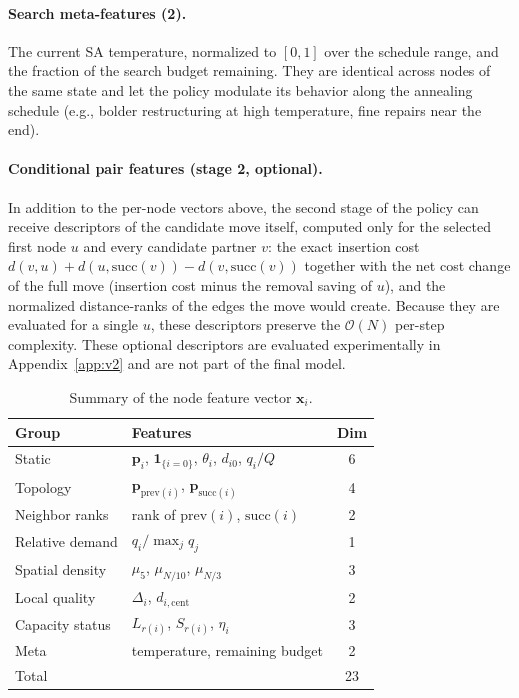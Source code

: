 \documentclass[letterpaper]{article} %
\begin{document}
\paragraph{Search meta-features (2).}
The current SA temperature, normalized to $[0,1]$ over the schedule range, and the fraction of the search budget remaining. They are identical across nodes of the same state and let the policy modulate its behavior along the annealing schedule (e.g., bolder restructuring at high temperature, fine repairs near the end).

\paragraph{Conditional pair features (stage 2, optional).}
In addition to the per-node vectors above, the second stage of the policy can receive descriptors of the candidate move itself, computed only for the selected first node $u$ and every candidate partner $v$: the exact insertion cost $d(v, u) + d(u, \mathrm{succ}(v)) - d(v, \mathrm{succ}(v))$ together with the net cost change of the full move (insertion cost minus the removal saving of $u$), and the normalized distance-ranks of the edges the move would create. Because they are evaluated for a single $u$, these descriptors preserve the $\mathcal{O}(N)$ per-step complexity. These optional descriptors are evaluated experimentally in Appendix~\ref{app:v2} and are not part of the final model.


\begin{table}[t]
\centering
\small
\begin{tabular}{l l c}
\toprule
\textbf{Group} & \textbf{Features} & \textbf{Dim} \\
\midrule
Static & $\mathbf{p}_i$, $\mathbf{1}_{\{i=0\}}$, $\theta_i$, $d_{i0}$, $q_i/Q$ & 6 \\
Topology & $\mathbf{p}_{\mathrm{prev}(i)}$, $\mathbf{p}_{\mathrm{succ}(i)}$ & 4 \\
Neighbor ranks & rank of $\mathrm{prev}(i)$, $\mathrm{succ}(i)$ & 2 \\
Relative demand & $q_i / \max_j q_j$ & 1 \\
Spatial density & $\mu_5$, $\mu_{N/10}$, $\mu_{N/3}$ & 3 \\
Local quality & $\Delta_i$, $d_{i,\mathrm{cent}}$ & 2 \\
Capacity status & $L_{r(i)}$, $S_{r(i)}$, $\eta_i$ & 3 \\
Meta & temperature, remaining budget & 2 \\
\midrule
Total & & 23 \\
\bottomrule
\end{tabular}
\caption{Summary of the node feature vector $\mathbf{x}_i$.}
\label{tab:features}
\end{table}
\end{document}
